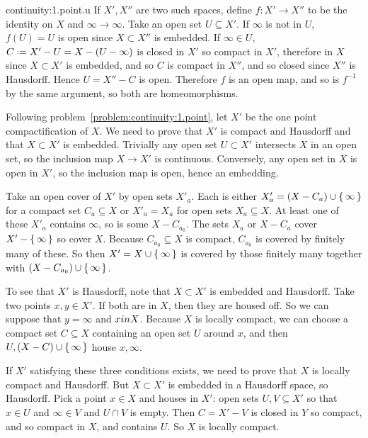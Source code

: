 \begin{answer}{continuity:1.point.u}
If \(X',X''\) are two such spaces, define \(f\colon X'\to X''\) to be the identity on \(X\) and \(\infty\to\infty\).
Take an open set \(U\subseteq X'\).
If \(\infty\) is not in \(U\), \(f(U)=U\) is open since \(X\subset X''\) is embedded.
If \(\infty\in U\), \(C\defeq X'-U=X-(U-\infty)\) is closed in \(X'\) so compact in \(X'\), therefore in \(X\) since \(X\subset X'\) is embedded, and so \(C\) is compact in \(X''\), and so closed since \(X''\) is Hausdorff.
Hence \(U=X''-C\) is open.
Therefore \(f\) is an open map, and so is \(f^{-1}\) by the same argument, so both are homeomorphisms.

Following problem~\vref{problem:continuity:1.point}, let \(X'\) be the one point compactification of \(X\).
We need to prove that \(X'\) is compact and Hausdorff and that \(X\subset X'\) is embedded.
Trivially any open set \(U\subset X'\) intersects \(X\) in an open set, so the inclusion map \(X\to X'\) is continuous.
Conversely, any open set in \(X\) is open in \(X'\), so the inclusion map is open, hence an embedding.

Take an open cover of \(X'\) by open sets \(X'_a\).
Each is either \(X'_a=(X-C_a)\cup\set{\infty}\) for a compact set \(C_a\subseteq X\) or \(X'_a=X_a\) for open sets \(X_a\subseteq X\).
At least one of these \(X'_a\) contains \(\infty\), so is some \(X-C_{a_0}\).
The sets \(X_a\) or \(X-C_a\) cover \(X'-\set{\infty}\) so cover \(X\).
Because \(C_{a_0}\subseteq X\) is compact, \(C_{a_0}\) is covered by finitely many of these.
So then \(X'=X\cup\set{\infty}\) is covered by those finitely many together with \((X-C_{a_0})\cup\set{\infty}\).

To see that \(X'\) is Hausdorff, note that \(X\subset X'\) is embedded and Hausdorff.
Take two points \(x,y\in X'\).
If both are in \(X\), then they are housed off.
So we can suppose that \(y=\infty\) and \(x\\in X\).
Because \(X\) is locally compact, we can choose a compact set \(C\subseteq X\) containing an open set \(U\) around \(x\), and then \(U,(X-C)\cup\set{\infty}\) house \(x,\infty\).

If \(X'\) satisfying these three conditions exists, we need to prove that \(X\) is locally compact and Hausdorff.
But \(X\subset X'\) is embedded in a Hausdorff space, so Hausdorff.
Pick a point \(x\in X\) and houses in \(X'\): open sets \(U,V\subseteq X'\) so that \(x\in U\) and \(\infty\in V\) and \(U\cap V\) is empty.
Then \(C=X'-V\) is closed in \(Y\) so compact, and so compact in \(X\), and contains \(U\).
So \(X\) is locally compact.
\end{answer}
